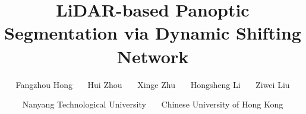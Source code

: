 \documentclass[final]{cvpr}
\begin{document}
\title{LiDAR-based Panoptic Segmentation via Dynamic Shifting Network}



\author{Fangzhou Hong~~~ Hui Zhou~~~ Xinge Zhu~~~ Hongsheng Li~~~ Ziwei Liu \and {\small Nanyang Technological University~~~ Chinese University of Hong Kong}}



\newcommand{\nickname}{DS-Net}
\newcommand{\fullname}{Dynamic Shifting Network}
\newcommand{\things}{\textit{things}}
\newcommand{\stuff}{\textit{stuff}}
\newcommand{\PQ}{PQ}
\newcommand{\PQda}{PQ\textsuperscript{}}
\newcommand{\RQ}{RQ}
\newcommand{\SQ}{SQ}
\newcommand{\PQth}{PQ\textsuperscript{Th}}
\newcommand{\RQth}{RQ\textsuperscript{Th}}
\newcommand{\SQth}{SQ\textsuperscript{Th}}
\newcommand{\PQst}{PQ\textsuperscript{St}}
\newcommand{\RQst}{RQ\textsuperscript{St}}
\newcommand{\SQst}{SQ\textsuperscript{St}}
\newcommand{\miou}{mIoU}

\newcommand{\road}{\rotatebox[origin=c]{90}{road}}
\newcommand{\side}{\rotatebox[origin=c]{90}{sidewalk}}
\newcommand{\park}{\rotatebox[origin=c]{90}{parking}}
\newcommand{\ogro}{\rotatebox[origin=c]{90}{other ground}}
\newcommand{\buil}{\rotatebox[origin=c]{90}{building}}
\newcommand{\car}{\rotatebox[origin=c]{90}{car}}
\newcommand{\truc}{\rotatebox[origin=c]{90}{truck}}
\newcommand{\bcle}{\rotatebox[origin=c]{90}{bicycle}}
\newcommand{\mcle}{\rotatebox[origin=c]{90}{motorcycle}}
\newcommand{\oveh}{\rotatebox[origin=c]{90}{other-vehicle}}
\newcommand{\vege}{\rotatebox[origin=c]{90}{vegetation}}
\newcommand{\trun}{\rotatebox[origin=c]{90}{trunk}}
\newcommand{\terr}{\rotatebox[origin=c]{90}{terrain}}
\newcommand{\pers}{\rotatebox[origin=c]{90}{person}}
\newcommand{\bcli}{\rotatebox[origin=c]{90}{bicyclist}}
\newcommand{\mcli}{\rotatebox[origin=c]{90}{motorcyclist}}
\newcommand{\fenc}{\rotatebox[origin=c]{90}{fence}}
\newcommand{\pole}{\rotatebox[origin=c]{90}{pole}}
\newcommand{\traf}{\rotatebox[origin=c]{90}{traffic sign}}

\end{document}
